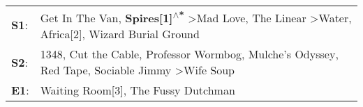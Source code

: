 \begin{supertabular}{p{0.03\textwidth}p{0.92\textwidth}}
 \textbf{S1}:  &  Get In The Van\textsuperscript{}, \enspace \textbf{Spires[1]\textsuperscript{$\wedge$*}} \textgreater \enspace Mad Love\textsuperscript{}, \enspace The Linear\textsuperscript{} \textgreater \enspace Water\textsuperscript{}, \enspace Africa[2]\textsuperscript{}, \enspace Wizard Burial Ground\textsuperscript{}  \enspace  \\
 \textbf{S2}:  &                          1348\textsuperscript{}, \enspace Cut the Cable\textsuperscript{}, \enspace Professor Wormbog\textsuperscript{}, \enspace Mulche's Odyssey\textsuperscript{}, \enspace Red Tape\textsuperscript{}, \enspace Sociable Jimmy\textsuperscript{} \textgreater \enspace Wife Soup\textsuperscript{}  \enspace  \\
 \textbf{E1}:  &                                                                                                                                                                                                                                       Waiting Room[3]\textsuperscript{}, \enspace The Fussy Dutchman\textsuperscript{}  \enspace  \\
\end{supertabular}

